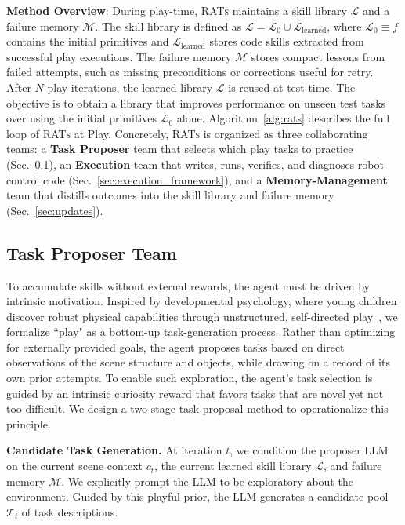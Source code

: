 \textbf{Method Overview}: During play-time, \textsc{RATs} maintains a skill library $\mathcal{L}$ and a failure memory $\mathcal{M}$. The skill library is defined as
$\mathcal{L} = \mathcal{L}_0 \cup \mathcal{L}_{\text{learned}}$, where $\mathcal{L}_0 \equiv f$ contains the initial primitives and $\mathcal{L}_{\text{learned}}$ stores code skills extracted from successful play executions. The failure memory $\mathcal{M}$ stores compact lessons from failed attempts, such as missing preconditions or corrections useful for retry.
After $N$ play iterations, the learned library $\mathcal{L}$ is reused at test time. The objective is to obtain a library that improves performance on unseen test tasks over using the initial primitives $\mathcal{L}_0$ alone.
Algorithm~\ref{alg:rats} describes the full loop of \textsc{RATs} at Play.
Concretely, \textsc{RATs} is organized as three collaborating teams: a \textbf{Task Proposer} team that selects which play tasks to practice (Sec.~\ref{sec:proposer}), an \textbf{Execution} team that writes, runs, verifies, and diagnoses robot-control code (Sec.~\ref{sec:execution_framework}), and a \textbf{Memory-Management} team that distills outcomes into the skill library and failure memory (Sec.~\ref{sec:updates}).








\subsection{Task Proposer Team}
\label{sec:proposer}
To accumulate skills without external rewards, the agent must be driven by intrinsic motivation.
Inspired by developmental psychology, where young children discover robust physical capabilities through unstructured, self-directed play~\cite{oudeyer2007intrinsic}, we formalize ``play" as a bottom-up task-generation process.
Rather than optimizing for externally provided goals, the agent proposes tasks based on direct observations of the scene structure and objects, while drawing on a record of its own prior attempts.
To enable such exploration, the agent's task selection is guided by an intrinsic curiosity reward that favors tasks that are novel yet not too difficult. We design a two-stage task-proposal method to operationalize this principle.

\textbf{Candidate Task Generation.} 
At iteration $t$, we condition the proposer LLM on the current scene context $c_t$, the current learned skill library $\mathcal{L}$, and failure memory $\mathcal{M}$. 
We explicitly prompt the LLM to be exploratory about the environment.
Guided by this playful prior, the LLM generates a candidate pool $\mathcal{T}_t$ of task descriptions.

